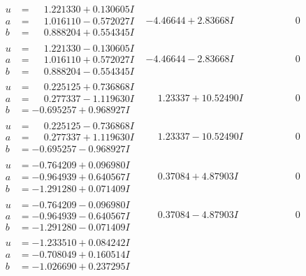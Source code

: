 \documentclass[1p]{elsarticle_modified}
\theoremstyle{definition}
\begin{document}
$$\begin{array}{c|c|c}
\begin{aligned}
u &= \phantom{-}1.221330 + 0.130605 I \\
a &= \phantom{-}1.016110 - 0.572027 I \\
b &= \phantom{-}0.888204 + 0.554345 I\end{aligned}
 & -4.46644 + 2.83668 I & \phantom{-0.000000 } 0 \\ \hline\begin{aligned}
u &= \phantom{-}1.221330 - 0.130605 I \\
a &= \phantom{-}1.016110 + 0.572027 I \\
b &= \phantom{-}0.888204 - 0.554345 I\end{aligned}
 & -4.46644 - 2.83668 I & \phantom{-0.000000 } 0 \\ \hline\begin{aligned}
u &= \phantom{-}0.225125 + 0.736868 I \\
a &= \phantom{-}0.277337 - 1.119630 I \\
b &= -0.695257 + 0.968927 I\end{aligned}
 & \phantom{-}1.23337 + 10.52490 I & \phantom{-0.000000 } 0 \\ \hline\begin{aligned}
u &= \phantom{-}0.225125 - 0.736868 I \\
a &= \phantom{-}0.277337 + 1.119630 I \\
b &= -0.695257 - 0.968927 I\end{aligned}
 & \phantom{-}1.23337 - 10.52490 I & \phantom{-0.000000 } 0 \\ \hline\begin{aligned}
u &= -0.764209 + 0.096980 I \\
a &= -0.964939 + 0.640567 I \\
b &= -1.291280 + 0.071409 I\end{aligned}
 & \phantom{-}0.37084 + 4.87903 I & \phantom{-0.000000 } 0 \\ \hline\begin{aligned}
u &= -0.764209 - 0.096980 I \\
a &= -0.964939 - 0.640567 I \\
b &= -1.291280 - 0.071409 I\end{aligned}
 & \phantom{-}0.37084 - 4.87903 I & \phantom{-0.000000 } 0 \\ \hline\begin{aligned}
u &= -1.233510 + 0.084242 I \\
a &= -0.708049 + 0.160514 I \\
b &= -1.026690 + 0.237295 I\end{aligned}

\end{array}$$
\end{document}

